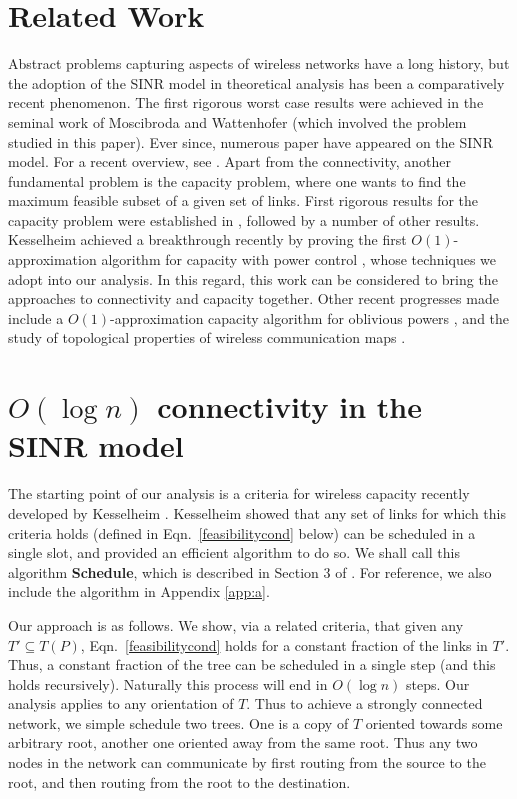 \documentclass[11pt]{amsart}
\begin{document}
\section{Related Work}
\label{sec:related}
Abstract problems capturing aspects of wireless networks have a long history, but the adoption of the SINR
model in theoretical analysis has been a comparatively recent phenomenon. The first rigorous worst case
results were achieved in the seminal work of Moscibroda and
Wattenhofer \cite{MoWa06} (which involved the problem studied in this paper). Ever since, numerous paper
have appeared on the SINR model. For a recent overview, see 
\cite{GoussevskaiaPW10}. Apart
from the connectivity, another fundamental problem is the capacity problem, where one wants to find
the maximum feasible subset of a given set of links. First rigorous results for the capacity problem 
were established in \cite{GHWW09}, followed
by a number of other results.
Kesselheim achieved a breakthrough recently by proving the first $O(1)$-approximation algorithm for capacity
with power control \cite{KesselheimSoda11}, whose techniques we adopt into our analysis. In this regard,
this work can be considered to bring the approaches to connectivity and capacity together. Other recent progresses
made include a $O(1)$-approximation capacity algorithm for oblivious powers \cite{SODA11}, and the study of topological properties of wireless communication maps \cite{stoc_topology11}.


\section{$O(\log n)$ connectivity in the SINR model}
\label{sec:conn}

The starting point of our analysis is a criteria for wireless capacity
recently developed by Kesselheim \cite{KesselheimSoda11}. Kesselheim
showed that any set of links for which this criteria holds (defined in
Eqn.~\ref{feasibilitycond} below) can be scheduled in a single slot,
and provided an efficient algorithm to do so. We shall 
call this algorithm \textbf{Schedule}, which is described in Section 3 of
\cite{KesselheimSoda11}. 
For reference, 
we also include the algorithm in Appendix \ref{app:a}.

Our approach is as follows. We show, via a related criteria, that
given any $T' \subseteq T(P)$, Eqn.~\ref{feasibilitycond} holds for
a constant fraction of the links in $T'$. Thus, a constant fraction of the
tree can be scheduled in a single step (and this holds
recursively). Naturally this process will end in $O(\log n)$
steps. Our analysis applies to any orientation of $T$. Thus to achieve
a strongly connected network, we simple schedule two trees. One is a
copy of $T$ oriented towards some arbitrary root, another one oriented
away from the same root. Thus any two nodes in the network can
communicate by first routing from the source to the root, and then
routing from the root to the destination.
\end{document}

